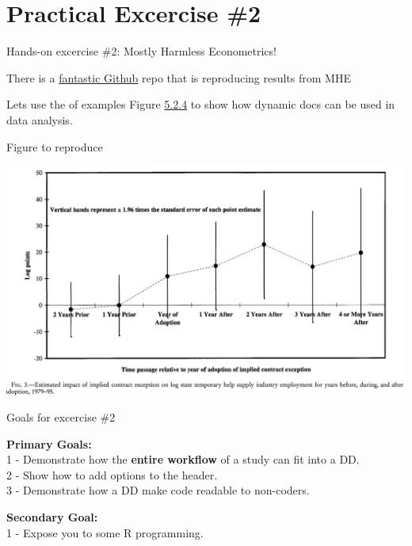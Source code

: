 \documentclass[ignorenonframetext,]{beamer}
\begin{document}
\section{Practical Excercise \#2}\label{practical-excercise-2}

\begin{frame}{Hands-on excercise \#2: Mostly Harmless Econometrics!}

There is a
\href{https://github.com/vikjam/mostly-harmless-replication}{fantastic
Github} repo that is reproducing results from MHE

Lets use the of examples Figure
\href{https://github.com/vikjam/mostly-harmless-replication/blob/master/05\%20Fixed\%20Effects\%2C\%20DD\%20and\%20Panel\%20Data/Figure\%205-2-4.r}{5.2.4}
to show how dynamic docs can be used in data analysis.

\end{frame}

\begin{frame}{Figure to reproduce}

\includegraphics{../Images/autor_fig.png}

\end{frame}

\begin{frame}{Goals for excercise \#2}

\textbf{Primary Goals:}\\
1 - Demonstrate how the \textbf{entire workflow} of a study can fit into
a DD.\\
2 - Show how to add options to the header.\\
3 - Demonstrate how a DD make code readable to non-coders.

\pause 

\textbf{Secondary Goal:}\\
1 - Expose you to some R programming.

\end{frame}
\end{document}

